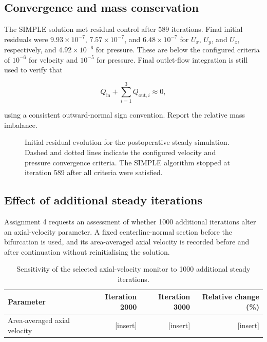 \documentclass[11pt,a4paper]{article}
\begin{document}
\subsection{Convergence and mass conservation}

The SIMPLE solution met residual control after 589 iterations. Final initial
residuals were $9.93\times10^{-7}$, $7.57\times10^{-7}$, and
$6.48\times10^{-7}$ for $U_x$, $U_y$, and $U_z$, respectively, and
$4.92\times10^{-6}$ for pressure. These are below the configured criteria of
$10^{-6}$ for velocity and $10^{-5}$ for pressure. Final outlet-flow integration
is still used to verify that

\begin{equation}
  Q_{\mathrm{in}} + \sum_{i=1}^{3} Q_{\mathrm{out},i} \approx 0,
\end{equation}

using a consistent outward-normal sign convention. Report the relative mass
imbalance.

\begin{figure}[htbp]
  \centering
  \resizebox{0.95\textwidth}{!}{}
  \caption{Initial residual evolution for the postoperative steady simulation.
  Dashed and dotted lines indicate the configured velocity and pressure
  convergence criteria. The SIMPLE algorithm stopped at iteration 589 after all
  criteria were satisfied.}
  \label{fig:steady_residuals}
\end{figure}

\subsection{Effect of additional steady iterations}

Assignment 4 requests an assessment of whether 1000 additional iterations alter
an axial-velocity parameter. A fixed centerline-normal section before the
bifurcation is used, and its area-averaged axial velocity is recorded before and
after continuation without reinitialising the solution.

\begin{table}[htbp]
  \centering
  \caption{Sensitivity of the selected axial-velocity monitor to 1000 additional
  steady iterations.}
  \label{tab:additional_iterations}
  \begin{tabular}{@{}lrrr@{}}
    \toprule
    Parameter & Iteration 2000 & Iteration 3000 & Relative change (\%) \\
    \midrule
    Area-averaged axial velocity & [insert] & [insert] & [insert] \\
    \bottomrule
  \end{tabular}
\end{table}
\end{document}
